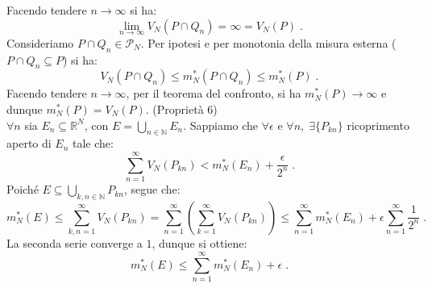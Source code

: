 \documentclass[a4paper,12pt]{report}
\theoremstyle{plain}
\theoremstyle{definition}
\theoremstyle{remark}
\numberwithin{equation}{section}
\begin{document}
Facendo tendere $n \to \infty$ si ha:
\begin{equation}
\lim_{n \to \infty} V_N(P \cap Q_n)=\infty=V_N(P)\;.
\end{equation}
Consideriamo $P \cap Q_n \in \mathcal{P}_N$. Per ipotesi e per monotonia della misura esterna ($P\cap Q_n \subseteq P$) si ha:
\begin{equation}
V_N(P \cap Q_n) \le m_N^*(P \cap Q_n) \le m_N^*(P)\;.
\end{equation}
Facendo tendere $n \to \infty$, per il teorema del confronto, si ha $m_N^*(P) \to \infty$ e dunque $m_N^*(P)=V_N(P)$.
\endproof
\proof (Proprietà 6) \\

$\forall n$ sia $E_n \subseteq \mathbb{R}^N$, con $E=\bigcup_{n \in \mathbb{N}} E_n$. Sappiamo che $\forall \epsilon$ e $\forall n,\;
\exists\{P_{kn}\}$ ricoprimento aperto di $E_n$ tale che:
\begin{equation}
\sum_{n=1}^{\infty} V_N(P_{kn}) < m_N^*(E_n)+\frac{\epsilon}{2^n}\;.
\end{equation}
Poiché $E \subseteq \bigcup_{k,n \in \mathbb{N}} P_{kn}$, segue che:
\begin{equation}
m_N^*(E) \le \sum_{k,n=1}^{\infty} V_N(P_{kn})=\sum_{n=1}^{\infty}\left(\sum_{k=1}^{\infty} V_N(P_{kn})\right) \le \sum_{n=1}^{\infty} 
m_N^*(E_n)+\epsilon\sum_{n=1}^{\infty} \frac{1}{2^n}\;.
\end{equation}
La seconda serie converge a $1$, dunque si ottiene:
\begin{equation}
m_N^*(E) \le \sum_{n=1}^{\infty} m_N^*(E_n)+\epsilon\;.
\end{equation}
\endproof
\end{document}
